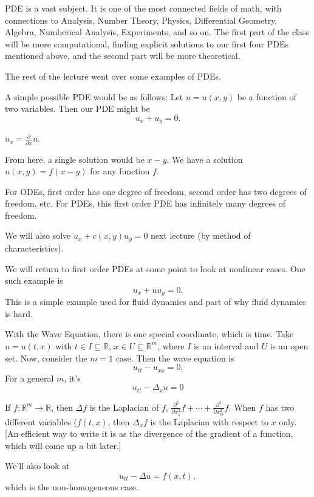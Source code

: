 PDE is a vast subject. It is one of the most connected fields of math, with connections to Analysis, Number Theory, Physics, Differential Geometry, Algebra, Numberical Analysis, Experiments, and so on. The first part of the class will be more computational, finding explicit solutions to our first four PDEs mentioned above, and the second part will be more theoretical.\pagebreak

The rest of the lecture went over some examples of PDEs.
\begin{example}
	A simple possible PDE would be as follows: Let \( u = u(x, y) \) be a function of two variables. Then our PDE might be \[ u_{x} + u_{y} = 0. \]
		\begin{remark}
			\( u_{x} = \frac{\partial}{\partial x} u \).
		\end{remark}
		From here, a single solution would be \( x - y \). We have a solution \( u(x, y) = f(x - y) \) for any function \( f \).
		\begin{remark}
		For ODEs, first order has one degree of freedom, second order has two degrees of freedom, etc. For PDEs, this first order PDE has infinitely many degrees of freedom.
		\end{remark}
		We will also solve \( u_{x} + c(x, y) u_{y} = 0 \) next lecture (by method of characteristics).
\end{example}

\begin{example}
	We will return to first order PDEs at some point to look at nonlinear cases. One such example is 
	\[ u_{x} + u u_{y} = 0. \]
	This is a simple example used for fluid dynamics and part of why fluid dynamics is hard.
\end{example}
\begin{example}
		With the Wave Equation, there is one special coordinate, which is time.
		Take \( u = u(t, x) \) with \( t \in I \subseteq \mathbb{R} \), \( x \in U \subseteq \mathbb{R}^{m} \), where \( I \) is an interval and \( U \) is an open set. Now, consider the \( m = 1 \) case. Then the wave equation is
		\[ u_{tt} - u_{x x} = 0. \]
		For a general \( m \), it's
		\[ u_{tt} - \Delta_{x} u = 0  \]
		\begin{remark}
			If \( f : \mathbb{R}^{m} \to \mathbb{R} \), then \( \Delta f \) is the Laplacian of \( f \), \( \frac{\partial^{2}}{\partial x_{1}^{2}} f + \cdots + \frac{\partial^{2}}{\partial x_{m}^{2}} f \). When \( f \) has two different variables (\( f(t, x) \), then \( \Delta_{x} f \) is the Laplacian with respect to \( x \) only. [An efficient way to write it is as the divergence of the gradient of a function, which will come up a bit later.]
		\end{remark}
		We'll also look at
		\[ u_{tt} - \Delta u = f(x, t), \]
		which is the non-homogeneous case.
\end{example}

